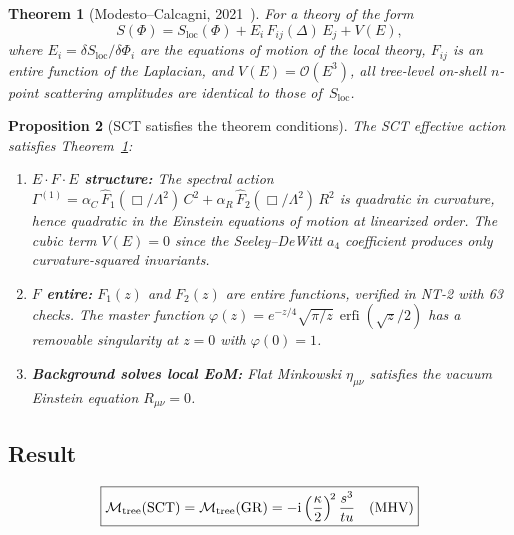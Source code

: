 \documentclass[11pt,a4paper]{article}
\newtheorem{proposition}{Proposition}[section]
\newtheorem{theorem}[proposition]{Theorem}
\theoremstyle{definition}
\theoremstyle{remark}
\newcommand{\ii}{\mathrm{i}}
\newcommand{\erfi}{\operatorname{erfi}}
\begin{document}
\begin{theorem}[Modesto--Calcagni, 2021~\cite{ModestoCalcagni2021}]
\label{thm:field-redef}
  For a theory of the form
  \begin{equation}
    S(\Phi) = S_{\mathrm{loc}}(\Phi) + E_i\, F_{ij}(\Delta)\, E_j + V(E),
  \end{equation}
  where $E_i = \delta S_{\mathrm{loc}}/\delta\Phi_i$ are the equations
  of motion of the local theory, $F_{ij}$ is an entire function of the
  Laplacian, and $V(E) = \mathcal{O}(E^3)$, all tree-level on-shell
  $n$-point scattering amplitudes are identical to those of~$S_{\mathrm{loc}}$.
\end{theorem}

\begin{proposition}[SCT satisfies the theorem conditions]
  The SCT effective action satisfies Theorem~\ref{thm:field-redef}:
  \begin{enumerate}
    \item \textbf{$E \cdot F \cdot E$ structure:} The spectral action
      $\Gamma^{(1)} = \alpha_C\, \hat{F}_1(\Box/\Lambda^2)\, C^2
      + \alpha_R\, \hat{F}_2(\Box/\Lambda^2)\, R^2$ is quadratic in
      curvature, hence quadratic in the Einstein equations of motion at
      linearized order. The cubic term $V(E) = 0$ since the Seeley--DeWitt
      $a_4$ coefficient produces only curvature-squared invariants.
    \item \textbf{$F$ entire:} $F_1(z)$ and $F_2(z)$ are entire functions,
      verified in NT-2 with 63 checks. The master function
      $\varphi(z) = e^{-z/4}\sqrt{\pi/z}\,\erfi(\sqrt{z}/2)$ has a
      removable singularity at $z=0$ with $\varphi(0) = 1$.
    \item \textbf{Background solves local EoM:} Flat Minkowski
      $\eta_{\mu\nu}$ satisfies the vacuum Einstein equation $R_{\mu\nu} = 0$.
  \end{enumerate}
\end{proposition}

\subsection{Result}

\begin{equation}
  \boxed{\mathcal{M}_{\mathrm{tree}}(\mathrm{SCT})
  = \mathcal{M}_{\mathrm{tree}}(\mathrm{GR})
  = -\ii\, \Bigl(\frac{\kappa}{2}\Bigr)^{\!2}\, \frac{s^3}{tu}\quad
  (\text{MHV})}
\end{equation}
\end{document}
